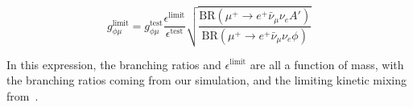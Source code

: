 \begin{equation}
    g_{\phi\mu}^\textrm{limit} = g_{\phi\mu}^\textrm{test} \frac{\epsilon^\textrm{limit}}{\epsilon^\textrm{test}}\sqrt{\frac{\textrm{BR}(\mu^+ \rightarrow e^+ \bar{\nu}_\mu \nu_e A')}{\textrm{BR}(\mu^+ \rightarrow e^+ \bar{\nu}_\mu \nu_e \phi)}}
    \label{eqn:gphi_limit_echenard}
\end{equation}

In this expression, the branching ratios and $\epsilon^\textrm{limit}$ are all a function of mass, with the branching ratios coming from our simulation, and the limiting kinetic mixing from~\cite{Echenard:2014lma}.
